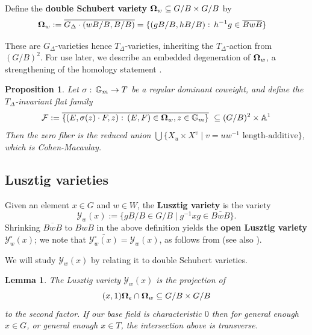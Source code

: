 \documentclass[10pt,a4paper]{amsart}
\newtheorem{lemma}[Thm]{Lemma}
\newtheorem{proposition}[Thm]{Proposition}
\newcommand{\MSB}[1]{\textcolor{violet}{[MSB: #1]}}
\newcommand{\AK}[1]{\textcolor{darkgreen}{[AK: #1]}}
\newcommand\bOm{{\bf \Omega}}
\def\AA{{\mathbb A }}
\newcommand\calY{{\mathcal Y}}
\newcommand\calF{{\mathcal F}}
\newcommand\Gm{{\mathbb G}_m}
\renewcommand\AA{{\mathbb A}}
\newcommand\junk[1]{}
\renewcommand{\colon}{\mathrel{:}}
\renewcommand{\colon}{:\mkern\thinmuskip}
\begin{document}
Define the \textbf{double Schubert variety} $\bOm_w \subseteq G/B \times G/B$ by
\begin{align*}
    \bOm_w &:= \overline{G_\Delta \cdot (wB/B,B/B)} 
    = \{(gB/B,hB/B)\colon h^{-1}g \in \overline{BwB} \}
\end{align*}


These are $G_{\Delta}$-varieties hence $T_{\Delta}$-varieties, inheriting the
$T_{\Delta}$-action from $(G/B)^2$. For use later, we describe an
embedded degeneration of $\bOm_w$, a strengthening of
the homology statement \cite[Proposition 3.8]{K20-deligne-lusztig}.

\begin{proposition}\label{prop: degeneration of double Schubert}
  \cite[Theorem 5.7, Lemma 5.10]{GabeRaj}
  Let $\sigma\colon \Gm \to T$ be a regular dominant coweight,
  and define the $T_\Delta$-invariant flat family
  \[ \calF := \overline{ \{(E,\sigma(z)\cdot F,z)\colon (E,F)\in \bOm_w,
    z \in \Gm\}} \ \subseteq (G/B)^2 \times \AA^1 \]
  Then the zero fiber is the reduced union
  $\bigcup \{X_u \times X^v \; \lvert \; v = uw^{-1} \text{ length-additive}\}$,
  which is Cohen-Macaulay.
\end{proposition}

\subsection{Lusztig varieties}

Given an element $x \in G$ and $w \in W$, the \textbf{Lusztig variety}
\cite{K20-deligne-lusztig} is the variety
 \[\calY_w(x) := \{gB/B \in G/B \; \lvert \; g^{-1} x g \in \overline{BwB}\}.\]
 Shrinking $\overline{BwB}$ to $BwB$ in the above definition yields the
 \textbf{open Lusztig variety} $\calY_w^\circ(x)$; we note that $\overline{\calY_w^\circ(x)}= \calY_w(x)$, as follows from \cite[Lemma 1.1]{Lus79} (see also \cite[Proposition 2.10]{BHL25-geomLusztig}).
 \junk{\AK{It is in no way a cell. Also, do we use it for anything?} 
 	\MSB{I was borrowing the terminology from \cite{BHL25-geomLusztig}, happy with your version instead. We only need it because Kim works with it and its closure instead of Lusztig varieties as we've defined them, so I wanted to justify that his results apply to us. I've streamlined.}}

 We will study $\calY_w(x)$ by relating it to double Schubert varieties. 

\begin{lemma}\label{prop:transverse-intersections-of-double-Schuberts}
The Lusztig variety $\calY_w(x)$ is the projection of 
\[(x, 1)\bOm_{e} \cap \bOm_w \subseteq G/B \times G/B\] to the second
factor. If our base field is characteristic $0$ then
for general enough $x\in G$, or general enough $x\in T$, the
intersection above is transverse.  \junk{Allen, should ``generic" be
  something else here?  Also it would be a lot nicer to say
  ``including for all regular semisimple $x$" but I do not know how to
  get this from Kleiman transversality directly.}
\end{lemma}
\end{document}
